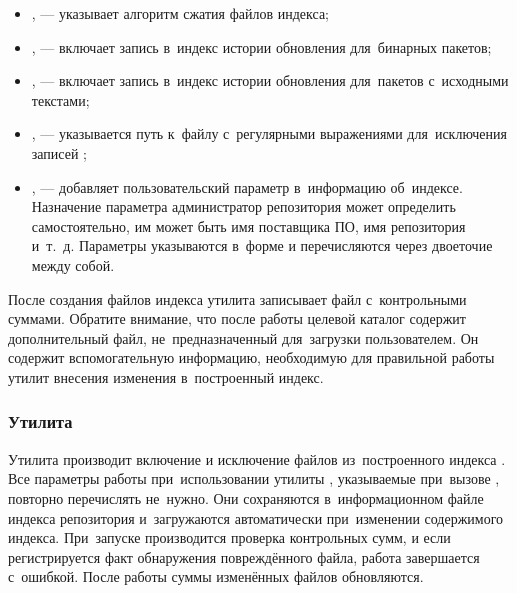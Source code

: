\begin{itemize}

\item {
,  --- указывает алгоритм сжатия файлов индекса;
}

\item {
,  --- включает запись в~индекс истории обновления для~бинарных пакетов;
}

\item {
,  --- включает запись в~индекс истории обновления для~пакетов с~исходными текстами;
}

\item {
,  --- указывается путь к~файлу с~регулярными выражениями для~исключения записей \requires;
}

\item {
,  --- добавляет пользовательский параметр в~информацию об~индексе.
Назначение параметра администратор репозитория может определить самостоятельно,
им может быть имя поставщика ПО, имя репозитория и~т.~д. 
Параметры указываются в~форме  и перечисляются через двоеточие между собой.
}

\end{itemize}

После создания файлов индекса утилита записывает файл с~контрольными суммами.
Обратите внимание, что после работы целевой каталог содержит дополнительный файл, не~предназначенный для~загрузки пользователем.
Он содержит вспомогательную информацию, необходимую для правильной работы утилит внесения изменения в~построенный индекс.

\subsubsection{Утилита }

Утилита  производит включение и исключение файлов из~построенного индекса \ds.
Все параметры работы при~использовании утилиты , указываемые при~вызове , повторно перечислять не~нужно.
Они сохраняются в~информационном файле индекса репозитория и~загружаются автоматически при~изменении   содержимого индекса.
При~запуске  производится проверка контрольных сумм, и если регистрируется факт обнаружения повреждённого файла, работа завершается с~ошибкой.
После работы суммы изменённых файлов обновляются.

